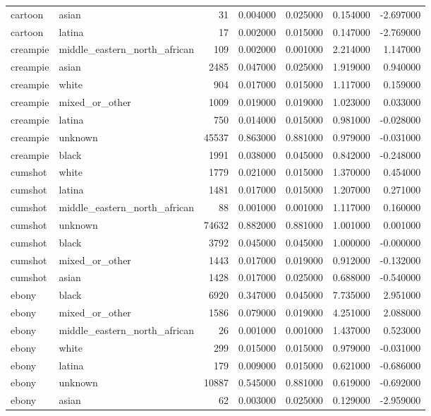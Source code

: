 \begin{tabular}{llrrrrr}
cartoon & asian & 31 & 0.004000 & 0.025000 & 0.154000 & -2.697000 \\
cartoon & latina & 17 & 0.002000 & 0.015000 & 0.147000 & -2.769000 \\
creampie & middle_eastern_north_african & 109 & 0.002000 & 0.001000 & 2.214000 & 1.147000 \\
creampie & asian & 2485 & 0.047000 & 0.025000 & 1.919000 & 0.940000 \\
creampie & white & 904 & 0.017000 & 0.015000 & 1.117000 & 0.159000 \\
creampie & mixed_or_other & 1009 & 0.019000 & 0.019000 & 1.023000 & 0.033000 \\
creampie & latina & 750 & 0.014000 & 0.015000 & 0.981000 & -0.028000 \\
creampie & unknown & 45537 & 0.863000 & 0.881000 & 0.979000 & -0.031000 \\
creampie & black & 1991 & 0.038000 & 0.045000 & 0.842000 & -0.248000 \\
cumshot & white & 1779 & 0.021000 & 0.015000 & 1.370000 & 0.454000 \\
cumshot & latina & 1481 & 0.017000 & 0.015000 & 1.207000 & 0.271000 \\
cumshot & middle_eastern_north_african & 88 & 0.001000 & 0.001000 & 1.117000 & 0.160000 \\
cumshot & unknown & 74632 & 0.882000 & 0.881000 & 1.001000 & 0.001000 \\
cumshot & black & 3792 & 0.045000 & 0.045000 & 1.000000 & -0.000000 \\
cumshot & mixed_or_other & 1443 & 0.017000 & 0.019000 & 0.912000 & -0.132000 \\
cumshot & asian & 1428 & 0.017000 & 0.025000 & 0.688000 & -0.540000 \\
ebony & black & 6920 & 0.347000 & 0.045000 & 7.735000 & 2.951000 \\
ebony & mixed_or_other & 1586 & 0.079000 & 0.019000 & 4.251000 & 2.088000 \\
ebony & middle_eastern_north_african & 26 & 0.001000 & 0.001000 & 1.437000 & 0.523000 \\
ebony & white & 299 & 0.015000 & 0.015000 & 0.979000 & -0.031000 \\
ebony & latina & 179 & 0.009000 & 0.015000 & 0.621000 & -0.686000 \\
ebony & unknown & 10887 & 0.545000 & 0.881000 & 0.619000 & -0.692000 \\
ebony & asian & 62 & 0.003000 & 0.025000 & 0.129000 & -2.959000 \\

\end{tabular}

